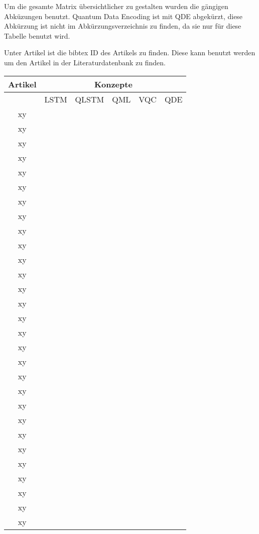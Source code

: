 
\label{konzeptmatrix}
Um die gesamte Matrix übersichtlicher zu gestalten wurden die gängigen Abküzungen benutzt.
Quantum Data Encoding ist mit QDE abgekürzt, diese Abkürzung ist nicht im Abkürzungsverzeichnis zu finden, da sie nur für diese Tabelle benutzt wird.

Unter Artikel ist die bibtex ID des Artikels zu finden. Diese kann benutzt werden um den Artikel in der Literaturdatenbank zu finden.

\begin{tabular}{|c|c|c|c|c|c|}
    \hline
    \textbf{Artikel} & \multicolumn{5}{|c|}{\textbf{Konzepte}} \\
    \hline
     & \ac{LSTM} & \ac{QLSTM} & \ac{QML} & \ac{VQC} & QDE \\
    \hline
    xy & & & & & \\
    xy & & & & & \\
    xy & & & & & \\
    xy & & & & & \\
    xy & & & & & \\
    xy & & & & & \\
    xy & & & & & \\
    xy & & & & & \\
    xy & & & & & \\
    xy & & & & & \\
    xy & & & & & \\
    xy & & & & & \\
    xy & & & & & \\
    xy & & & & & \\
    xy & & & & & \\
    xy & & & & & \\
    xy & & & & & \\
    xy & & & & & \\
    xy & & & & & \\
    xy & & & & & \\
    xy & & & & & \\
    xy & & & & & \\
    xy & & & & & \\
    xy & & & & & \\
    xy & & & & & \\
    xy & & & & & \\
    xy & & & & & \\
    xy & & & & & \\
    xy & & & & & \\
    \hline
\end{tabular}


